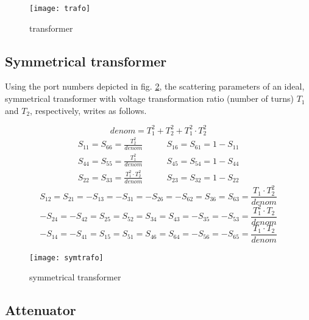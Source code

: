 \documentclass[10pt]{report}
\begin{document}
\begin{figure}[ht]
\begin{center}
\texttt{[image: trafo]}
\end{center}
\caption{transformer}
\label{fig:trafo}
\end{figure}
\FloatBarrier

\subsection{Symmetrical transformer}

Using the port numbers depicted in fig. \ref{fig:symtrafo}, the
scattering parameters of an ideal, symmetrical transformer with
voltage transformation ratio (number of turns) $T_1$ and $T_2$,
respectively, writes as follows.

\begin{equation}
denom = T_1^2+T_2^2+T_1^2\cdot T_2^2
\end{equation}
\begin{eqnarray}
S_{11} = S_{66} = \frac{T_2^2}{denom}  &  \qquad S_{16} = S_{61} = 1-S_{11} \\
S_{44} = S_{55} = \frac{T_1^2}{denom}  &  \qquad S_{45} = S_{54} = 1-S_{44} \\
S_{22} = S_{33} = \frac{T_1^2\cdot T_2^2}{denom}  &  \qquad S_{23} = S_{32} = 1-S_{22}
\end{eqnarray}
\begin{equation}
S_{12} = S_{21} = -S_{13} = -S_{31} = -S_{26} = -S_{62} = S_{36} = S_{63}
       = \frac{T_1\cdot T_2^2}{denom}
\end{equation}
\begin{equation}
-S_{24} = -S_{42} = S_{25} = S_{52} = S_{34} = S_{43} = -S_{35} = -S_{53}
       = \frac{T_1^2\cdot T_2}{denom}
\end{equation}
\begin{equation}
-S_{14} = -S_{41} = S_{15} = S_{51} = S_{46} = S_{64} = -S_{56} = -S_{65}
       = \frac{T_1\cdot T_2}{denom}
\end{equation}

\begin{figure}[ht]
\begin{center}
\texttt{[image: symtrafo]}
\end{center}
\caption{symmetrical transformer}
\label{fig:symtrafo}
\end{figure}
\FloatBarrier

\subsection{Attenuator}
\end{document}
